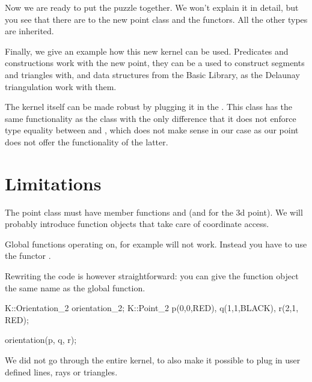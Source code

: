 Now we are ready to put the puzzle together. We won't explain it in
detail, but you see that there are  to the new point
class and the functors. All the other types are inherited.



\ccHtmlLinksOff


\ccHtmlLinksOn



Finally, we give an example how this new kernel can be used.
Predicates and constructions work with the new point, they
can be a used to construct segments and triangles with, and
data structures from the Basic Library, as the Delaunay
triangulation work with them.  

The kernel itself can be
made robust by plugging it in the .
This class has the same functionality as the class 
with the only difference that it does not enforce type equality
between  and , which
does not make sense in our case as our point does not offer
the functionality of the latter.


\ccHtmlLinksOff
{}
\ccHtmlLinksOn


\section{Limitations}

The point class must have member functions  and 
(and  for the 3d point). We will probably
introduce function objects that take care of coordinate
access.

Global functions operating on, for example
 will not work. 
Instead you have to use the functor .

Rewriting the code is however straightforward: you can give
the function object the same name as the global function.

\ccHtmlLinksOff
\begin{ccExampleCode}

K::Orientation_2 orientation_2;
K::Point_2 p(0,0,RED), q(1,1,BLACK), r(2,1, RED);

orientation(p, q, r);

\end{ccExampleCode}
\ccHtmlLinksOn

We did not go through the entire kernel, to also make
it possible to plug in user defined lines, rays or triangles.







